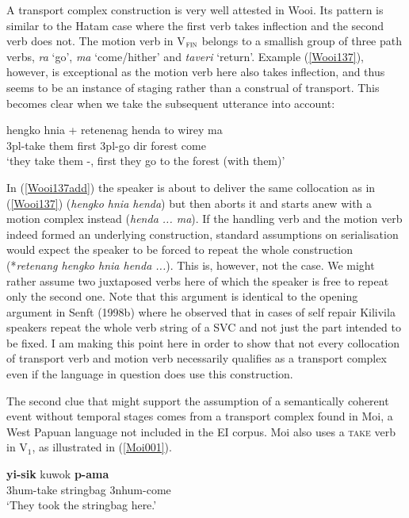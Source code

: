 A transport complex construction is very well attested in Wooi. Its pattern is similar to the Hatam case where the first verb takes inflection and the second verb does not. The motion verb in V$_{\textsc{fin}}$ belongs to a smallish group of three path verbs, \textit{ra} `go', \textit{ma} `come/hither' and \textit{taveri} `return'. Example (\ref{Wooi137}), however, is exceptional as the motion verb here also takes inflection, and thus seems to be an instance of staging rather than a construal of transport. This becomes clear when we take the subsequent utterance into account:

\ea \label{Wooi137add}
\gll hengko hnia  + retenenag henda to wirey ma \\
\acs{3}\acs{pl}-take them first \acs{3}\acs{pl}-go \acs{dir} forest come \\
\glft `they take them -, first they go to the forest (with them)' \\ 
\z
\xe

In (\ref{Wooi137add}) the speaker is about to deliver the same collocation as in (\ref{Wooi137}) (\textit{hengko hnia henda}) but then aborts it and starts anew with a motion complex instead (\textit{henda ... ma}). If the handling verb and the motion verb indeed formed an underlying construction, standard assumptions on serialisation would expect the speaker to be forced to repeat the whole construction (*\textit{retenang hengko hnia henda ...}). This is, however, not the case. We might rather assume two juxtaposed verbs here of which the speaker is free to repeat only the second one. Note that this argument is identical to the opening argument in Senft (1998b) where he observed that in cases of self repair Kilivila speakers repeat the whole verb string of a SVC and not just the part intended to be fixed. I am making this point here in order to show that not every collocation of transport verb and motion verb necessarily qualifies as a transport complex even if the language in question does use this construction.

The second clue that might support the assumption of a semantically coherent event without temporal stages comes from a transport complex found in Moi, a West Papuan language not included in the EI corpus. Moi also uses a \textsc{take} verb in V$_{1}$, as illustrated in (\ref{Moi001}).

\ea \label{Moi001}
\gll \textbf{yi-sik} kuwok \textbf{p-ama} \\
\acs{3}\acs{hum}-take stringbag \acs{3}\acs{nhum}-come \\
\glft `They took the stringbag here.' \\ 
\z
\xe

